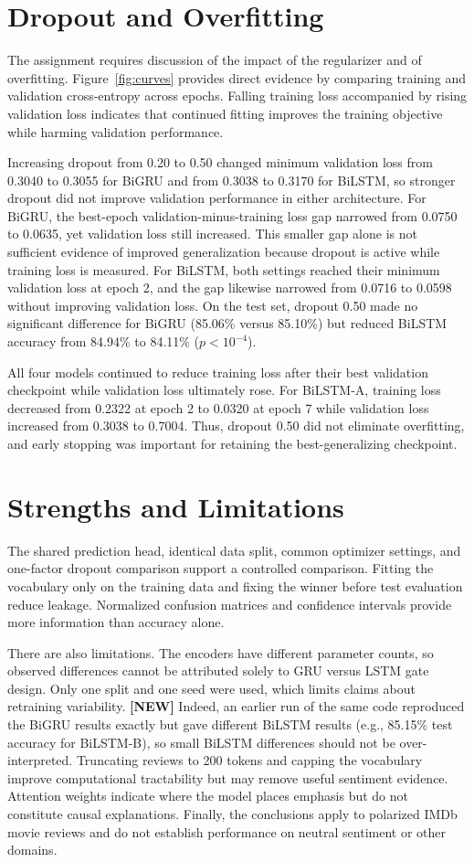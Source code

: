 \documentclass[conference]{IEEEtran}
\begin{document}
\section{Dropout and Overfitting}
The assignment requires discussion of the impact of the regularizer and of overfitting. Figure~\ref{fig:curves} provides direct evidence by comparing training and validation cross-entropy across epochs. Falling training loss accompanied by rising validation loss indicates that continued fitting improves the training objective while harming validation performance.

Increasing dropout from 0.20 to 0.50 changed minimum validation loss from 0.3040 to 0.3055 for BiGRU and from 0.3038 to 0.3170 for BiLSTM, so stronger dropout did not improve validation performance in either architecture. For BiGRU, the best-epoch validation-minus-training loss gap narrowed from 0.0750 to 0.0635, yet validation loss still increased. This smaller gap alone is not sufficient evidence of improved generalization because dropout is active while training loss is measured. For BiLSTM, both settings reached their minimum validation loss at epoch 2, and the gap likewise narrowed from 0.0716 to 0.0598 without improving validation loss. On the test set, dropout 0.50 made no significant difference for BiGRU (85.06\% versus 85.10\%) but reduced BiLSTM accuracy from 84.94\% to 84.11\% ($p<10^{-4}$).

All four models continued to reduce training loss after their best validation checkpoint while validation loss ultimately rose. For BiLSTM-A, training loss decreased from 0.2322 at epoch 2 to 0.0320 at epoch 7 while validation loss increased from 0.3038 to 0.7004. Thus, dropout 0.50 did not eliminate overfitting, and early stopping was important for retaining the best-generalizing checkpoint.

\section{Strengths and Limitations}
The shared prediction head, identical data split, common optimizer settings, and one-factor dropout comparison support a controlled comparison. Fitting the vocabulary only on the training data and fixing the winner before test evaluation reduce leakage. Normalized confusion matrices and confidence intervals provide more information than accuracy alone.

There are also limitations. The encoders have different parameter counts, so observed differences cannot be attributed solely to GRU versus LSTM gate design. Only one split and one seed were used, which limits claims about retraining variability. \textbf{[NEW]} Indeed, an earlier run of the same code reproduced the BiGRU results exactly but gave different BiLSTM results (e.g., 85.15\% test accuracy for BiLSTM-B), so small BiLSTM differences should not be over-interpreted. Truncating reviews to 200 tokens and capping the vocabulary improve computational tractability but may remove useful sentiment evidence. Attention weights indicate where the model places emphasis but do not constitute causal explanations. Finally, the conclusions apply to polarized IMDb movie reviews and do not establish performance on neutral sentiment or other domains.
\end{document}
